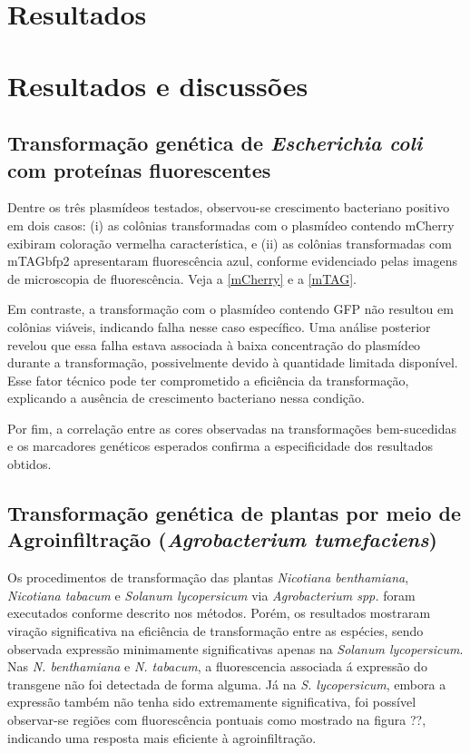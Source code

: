 \section{Resultados}
\section{Resultados e discussões}
\subsection{Transformação genética de \textit{Escherichia coli} com proteínas
fluorescentes}
Dentre os três plasmídeos testados, observou-se crescimento
bacteriano positivo em dois casos: (i) as colônias transformadas com o plasmídeo
contendo mCherry exibiram coloração vermelha característica, e (ii) as colônias
transformadas com mTAGbfp2 apresentaram fluorescência azul, conforme evidenciado
pelas imagens de microscopia de fluorescência. Veja a \cref{mCherry} e a
\cref{mTAG}.

Em contraste, a transformação com o plasmídeo contendo GFP não resultou em
colônias viáveis, indicando falha nesse caso específico. Uma análise posterior
revelou que essa falha estava associada à baixa concentração do plasmídeo
durante a transformação, possivelmente devido à quantidade limitada disponível.
Esse fator técnico pode ter comprometido a eficiência da transformação,
explicando a ausência de crescimento bacteriano nessa condição.

Por fim, a correlação entre as cores observadas na transformações bem-sucedidas
e os marcadores genéticos esperados confirma a especificidade dos resultados
obtidos.

\subsection{Transformação genética de plantas por meio de Agroinfiltração (\textit{Agrobacterium tumefaciens})}
Os procedimentos de transformação das plantas \textit{Nicotiana benthamiana}, \textit{Nicotiana tabacum} e \textit{Solanum lycopersicum} via \textit{Agrobacterium spp.} foram executados conforme descrito nos métodos. Porém, os resultados mostraram viração significativa na eficiência de transformação entre as espécies, sendo observada expressão minimamente significativas apenas na \textit{Solanum lycopersicum}.
Nas \textit{N. benthamiana} e \textit{N. tabacum}, a fluorescencia associada á expressão do transgene não foi detectada de forma alguma. Já na \textit{S. lycopersicum}, embora a expressão também não tenha sido extremamente significativa, foi possível observar-se regiões com fluorescência pontuais como mostrado na figura ??, indicando uma resposta mais eficiente à agroinfiltração.

